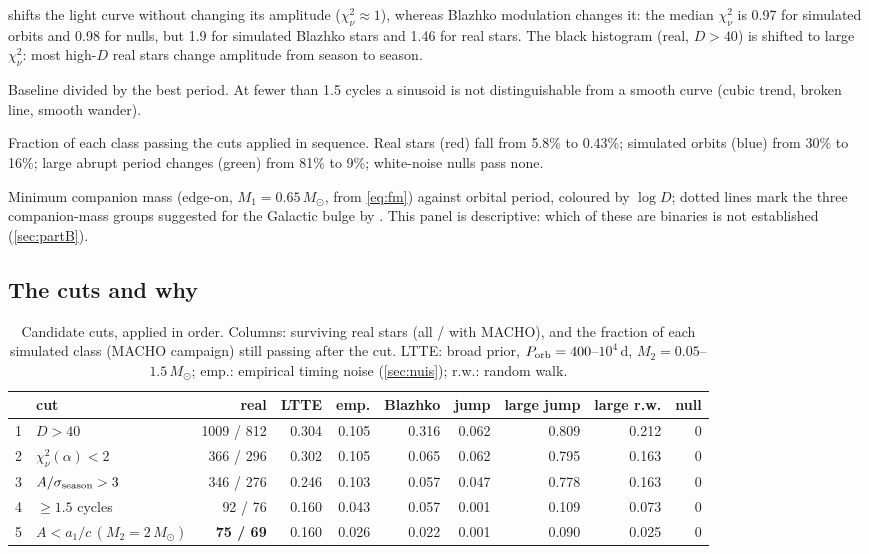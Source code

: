 \documentclass[11pt]{article}
\newcommand{\Msun}{\ensuremath{M_\odot}}
\begin{document}
\begin{description}[leftmargin=0pt,style=nextline]
shifts the light curve without changing its amplitude ($\chi^2_\nu\approx1$), whereas Blazhko modulation changes it:
the median $\chi^2_\nu$ is 0.97 for simulated orbits and 0.98 for nulls, but 1.9 for simulated Blazhko stars and 1.46
for real stars. The black histogram (real, $D>40$) is shifted to large $\chi^2_\nu$: most high-$D$ real stars change
amplitude from season to season.
\item[(f) Cycles covered.] Baseline divided by the best period. At fewer than 1.5 cycles a sinusoid is not distinguishable
from a smooth curve (cubic trend, broken line, smooth wander).
\item[(g) Selection funnel.] Fraction of each class passing the cuts applied in sequence. Real stars (red) fall from
5.8\% to 0.43\%; simulated orbits (blue) from 30\% to 16\%; large abrupt period changes (green) from 81\% to 9\%;
white-noise nulls pass none.
\item[(h) Candidates.] Minimum companion mass (edge-on, $M_1=0.65\,\Msun$, from \cref{eq:fm}) against orbital period,
coloured by $\log D$; dotted lines mark the three companion-mass groups suggested for the Galactic bulge by
\citet{Hajdu2021}. This panel is descriptive: which of these are binaries is not established (\cref{sec:partB}).
\end{description}

\subsection{The cuts and why}\label{sec:cuts}
\begin{table}[h]
\centering
\caption{Candidate cuts, applied in order. Columns: surviving real stars (all / with MACHO), and the fraction of each
simulated class (MACHO campaign) still passing after the cut. LTTE: broad prior, $P_{\rm orb}=400$--$10^4$\,d,
$M_2=0.05$--$1.5\,\Msun$; emp.: empirical timing noise (\cref{sec:nuis}); r.w.: random walk.}
\label{tab:cuts}
\small
\begin{tabular}{llrrrrrrrr}
\toprule
& cut & real & LTTE & emp. & Blazhko & jump & large jump & large r.w. & null\\
\midrule
1 & $D>40$ & 1009 / 812 & 0.304 & 0.105 & 0.316 & 0.062 & 0.809 & 0.212 & 0\\
2 & $\chi^2_\nu(\alpha)<2$ & 366 / 296 & 0.302 & 0.105 & 0.065 & 0.062 & 0.795 & 0.163 & 0\\
3 & $A/\sigma_{\rm season}>3$ & 346 / 276 & 0.246 & 0.103 & 0.057 & 0.047 & 0.778 & 0.163 & 0\\
4 & $\ge1.5$ cycles & 92 / 76 & 0.160 & 0.043 & 0.057 & 0.001 & 0.109 & 0.073 & 0\\
5 & $A<a_1/c\,(M_2=2\,\Msun)$ & \textbf{75 / 69} & 0.160 & 0.026 & 0.022 & 0.001 & 0.090 & 0.025 & 0\\
\bottomrule
\end{tabular}
\end{table}
\end{document}
